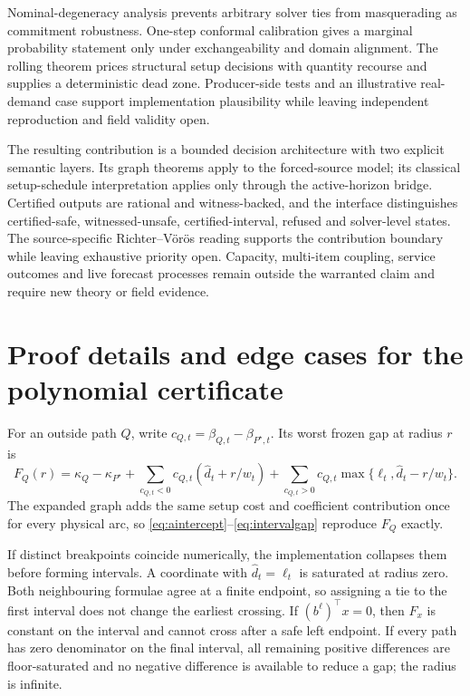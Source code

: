 \documentclass[11pt]{article}
\theoremstyle{definition}
\newcommand{\dhat}{\widehat d}
\newcommand{\ellv}{\ell}
\begin{document}
Nominal-degeneracy analysis prevents arbitrary solver ties from masquerading as commitment robustness. One-step conformal calibration gives a marginal probability statement only under exchangeability and domain alignment. The rolling theorem prices structural setup decisions with quantity recourse and supplies a deterministic dead zone. Producer-side tests and an illustrative real-demand case support implementation plausibility while leaving independent reproduction and field validity open.

The resulting contribution is a bounded decision architecture with two explicit semantic layers. Its graph theorems apply to the forced-source model; its classical setup-schedule interpretation applies only through the active-horizon bridge. Certified outputs are rational and witness-backed, and the interface distinguishes certified-safe, witnessed-unsafe, certified-interval, refused and solver-level states. The source-specific Richter--V{\"o}r{\"o}s reading supports the contribution boundary while leaving exhaustive priority open. Capacity, multi-item coupling, service outcomes and live forecast processes remain outside the warranted claim and require new theory or field evidence.

\clearpage
\appendix

\section{Proof details and edge cases for the polynomial certificate}\label{app:proof}

For an outside path $Q$, write $c_{Q,t}=\beta_{Q,t}-\beta_{P^\star,t}$. Its worst frozen gap at radius $r$ is
\[
F_Q(r)=\kappa_Q-\kappa_{P^\star}
+\sum_{c_{Q,t}<0}c_{Q,t}(\dhat_t+r/w_t)
+\sum_{c_{Q,t}>0}c_{Q,t}\max\{\ellv_t,\dhat_t-r/w_t\}.
\]
The expanded graph adds the same setup cost and coefficient contribution once for every physical arc, so \eqref{eq:aintercept}--\eqref{eq:intervalgap} reproduce $F_Q$ exactly.

If distinct breakpoints coincide numerically, the implementation collapses them before forming intervals. A coordinate with $\dhat_t=\ellv_t$ is saturated at radius zero. Both neighbouring formulae agree at a finite endpoint, so assigning a tie to the first interval does not change the earliest crossing. If $(b^\ell)^\top x=0$, then $F_x$ is constant on the interval and cannot cross after a safe left endpoint. If every path has zero denominator on the final interval, all remaining positive differences are floor-saturated and no negative difference is available to reduce a gap; the radius is infinite.
\end{document}
